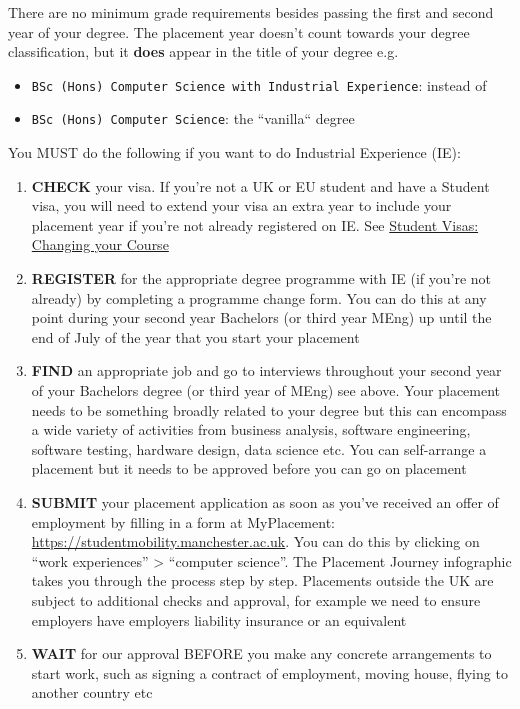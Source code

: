 \documentclass[
]{book}
\providecommand{\tightlist}{%
  \setlength{\itemsep}{0pt}\setlength{\parskip}{0pt}}
\begin{document}
There are no minimum grade requirements besides passing the first and second year of your degree. The placement year doesn't count towards your degree classification, but it \textbf{does} appear in the title of your
degree e.g.

\begin{itemize}
\tightlist
\item
  \texttt{BSc\ (Hons)\ Computer\ Science\ with\ Industrial\ Experience}: instead of
\item
  \texttt{BSc\ (Hons)\ Computer\ Science}: the ``vanilla`` degree
\end{itemize}

You MUST do the following if you want to do Industrial Experience (IE):

\begin{enumerate}
\def\labelenumi{\arabic{enumi}.}
\tightlist
\item
  \textbf{CHECK} your visa. If you're not a UK or EU student and have a Student visa, you will need to extend your visa an extra year to include your placement year if you're not already registered on IE. See \href{documents.manchester.ac.uk/display.aspx?DocID=37044}{Student Visas: Changing your Course} \citep{changing}
\item
  \textbf{REGISTER} for the appropriate degree programme with IE (if you're not already) by completing a programme change form. You can do this at any point during your second year Bachelors (or third year MEng) up until the end of July of the year that you start your placement
\item
  \textbf{FIND} an appropriate job and go to interviews throughout your second year of your Bachelors degree (or third year of MEng) see above. Your placement needs to be something broadly related to your degree but this can encompass a wide variety of activities from business analysis, software engineering, software testing, hardware design, data science etc. You can self-arrange a placement but it needs to be approved before you can go on placement
\item
  \textbf{SUBMIT} your placement application as soon as you've received an offer of employment by filling in a form at MyPlacement: \href{studentmobility.manchester.ac.uk}{https://studentmobility.manchester.ac.uk}. You can do this by clicking on ``work experiences'' \textgreater{} ``computer science''. The Placement Journey infographic takes you through the process step by step. Placements outside the UK are subject to additional checks and approval, for example we need to ensure employers have employers liability insurance or an equivalent
\item
  \textbf{WAIT} for our approval BEFORE you make any concrete arrangements to start work, such as signing a contract of employment, moving house, flying to another country etc
\end{enumerate}
\end{document}
